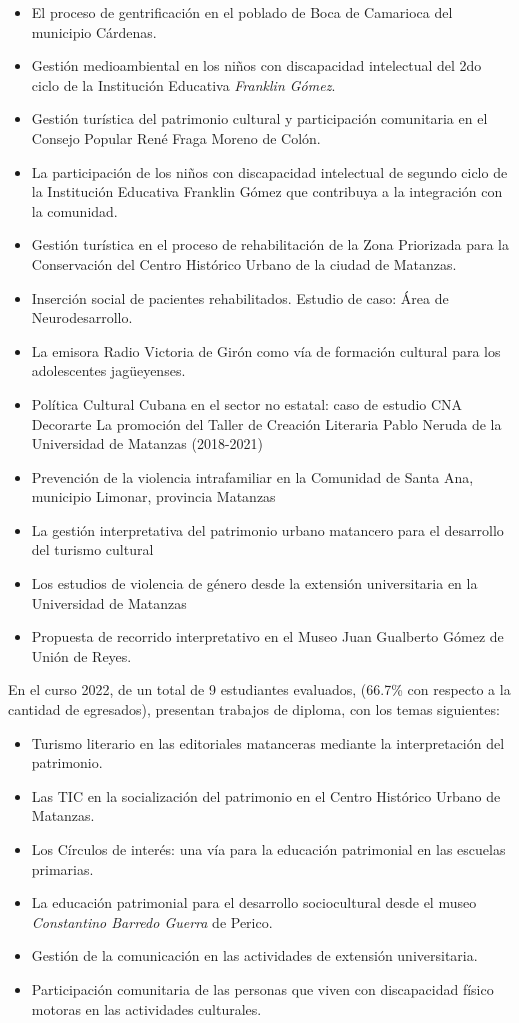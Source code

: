 \begin{itemize}
	\item El proceso de gentrificación en el poblado de Boca de Camarioca del municipio Cárdenas. 
	\item Gestión medioambiental en los niños con discapacidad intelectual del 2do ciclo de la Institución Educativa \emph{Franklin Gómez}.
	\item Gestión turística del patrimonio cultural y participación comunitaria en el Consejo Popular René Fraga Moreno de Colón.
	\item La participación de los niños con discapacidad intelectual de segundo ciclo de la Institución Educativa Franklin Gómez que contribuya a la integración con la comunidad.
	\item Gestión turística en el proceso de rehabilitación de la Zona Priorizada para la Conservación del Centro Histórico Urbano de la ciudad de Matanzas.
	\item Inserción social de pacientes rehabilitados. Estudio de caso: Área de Neurodesarrollo.
	\item La emisora Radio Victoria de Girón como vía de formación cultural para los adolescentes jagüeyenses.
	\item Política Cultural Cubana en el sector no estatal: caso de estudio CNA Decorarte
	La promoción del Taller de Creación Literaria Pablo Neruda de la Universidad de Matanzas (2018-2021)  
	\item Prevención de la violencia intrafamiliar en la Comunidad de Santa Ana, municipio Limonar, provincia Matanzas 
	\item La gestión interpretativa del patrimonio urbano matancero para el desarrollo del turismo cultural
	\item Los estudios de violencia de género desde la extensión universitaria en la Universidad de Matanzas
	\item Propuesta de recorrido interpretativo en el Museo Juan Gualberto Gómez de Unión de Reyes. 
\end{itemize}

En el curso 2022, de un total de 9 estudiantes evaluados, (66.7\% con respecto a la cantidad de egresados), presentan trabajos de diploma, con los temas siguientes:  

\begin{itemize}
	\item Turismo literario en las editoriales matanceras mediante la interpretación del patrimonio.
	\item Las TIC en la socialización del patrimonio en el Centro Histórico Urbano de Matanzas.
	\item Los Círculos de interés: una vía para la educación patrimonial en las escuelas primarias.
	\item La educación patrimonial para el desarrollo sociocultural desde el museo \emph{Constantino Barredo Guerra} de Perico.
	\item Gestión de la comunicación en las actividades de extensión universitaria.
	\item Participación comunitaria de las personas que viven con discapacidad físico motoras en las actividades culturales.
\end{itemize}

